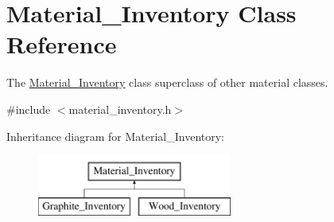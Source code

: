 \hypertarget{classMaterial__Inventory}{}\section{Material\+\_\+\+Inventory Class Reference}
\label{classMaterial__Inventory}


The \hyperlink{classMaterial__Inventory}{Material\+\_\+\+Inventory} class superclass of other material classes.  




{\ttfamily \#include $<$material\+\_\+inventory.\+h$>$}

Inheritance diagram for Material\+\_\+\+Inventory\+:\begin{figure}[H]
\begin{center}
\leavevmode
\includegraphics[height=2.000000cm]{classMaterial__Inventory}
\end{center}
\end{figure}
